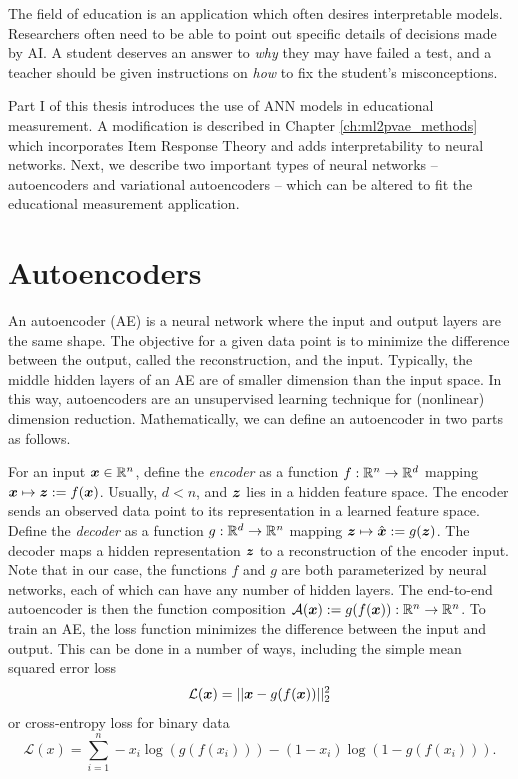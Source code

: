 The field of education is an application which often desires interpretable models. Researchers often need to be able to point out specific details of decisions made by AI. A student deserves an answer to \textit{why} they may have failed a test, and a teacher should be given instructions on \textit{how} to fix the student's misconceptions. 

Part I of this thesis introduces the use of ANN models in educational measurement. A modification is described in Chapter \ref{ch:ml2pvae_methods} which incorporates Item Response Theory and adds interpretability to neural networks. Next, we describe two important types of neural networks -- autoencoders and variational autoencoders -- which can be altered to fit the educational measurement application.

\section{Autoencoders}
An autoencoder (AE) is a neural network where the input and output layers are the same shape. The objective for a given data point is to minimize the difference between the output, called the reconstruction, and the input. Typically, the middle hidden layers of an AE are of smaller dimension than the input space. In this way, autoencoders are an unsupervised learning technique for (nonlinear) dimension reduction. Mathematically, we can define an autoencoder in two parts as follows.

For an input $\boldsymbol{x} \in \mathbb{R}^n$, define the \textit{encoder} as a function $f: \mathbb{R}^n \to \mathbb{R}^d$ mapping $\boldsymbol{x} \mapsto \boldsymbol{z} := f(\boldsymbol{x})$. Usually, $d < n$, and $\boldsymbol{z}$ lies in a hidden feature space. The encoder sends an observed data point to its representation in a learned feature space. Define the \textit{decoder} as a function $g: \mathbb{R}^d \to \mathbb{R}^n$ mapping $\boldsymbol{z} \mapsto \hat{\boldsymbol{x}} := g(\boldsymbol{z})$. The decoder maps a hidden representation $\boldsymbol{z}$ to a reconstruction of the encoder input. Note that in our case, the functions $f$ and $g$ are both parameterized by neural networks, each of which can have any number of hidden layers. The end-to-end autoencoder is then the function composition $\mathcal{A}(\boldsymbol{x}):= g(f(\boldsymbol{x})): \mathbb{R}^n \to \mathbb{R}^n$. To train an AE, the loss function minimizes the difference between the input and output. This can be done in a number of ways, including the simple mean squared error loss
\begin{equation}
  \mathcal{L}(\boldsymbol{x}) = || \boldsymbol{x} - g(f(\boldsymbol{x}))||_2^2
  \label{eq:mse}
\end{equation}
or cross-entropy loss for binary data
\begin{equation}
  \mathcal{L}(x) = \sum_{i=1}^n - x_i \log(g(f(x_i))) - (1-x_i)\log(1- g(f(x_i))).
  \label{eq:cross_entropy}
\end{equation}

